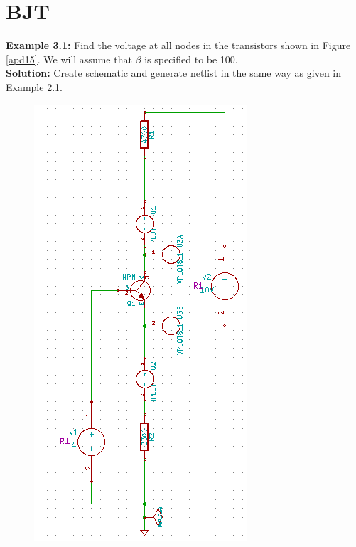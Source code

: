 \section {BJT}

\textbf{Example 3.1:} Find the voltage at all nodes in the transistors shown in Figure \ref{apd15}. We will assume that $\beta$ is specified to be 100.\\


\textbf{Solution:}  Create schematic and generate netlist in the same way as given in Example 2.1. 
         

\begin{figure}%
\begin{center}
\includegraphics[angle=90,width=\linewidth]{figures/apd15.png}%

\end{center}
\end{figure}
